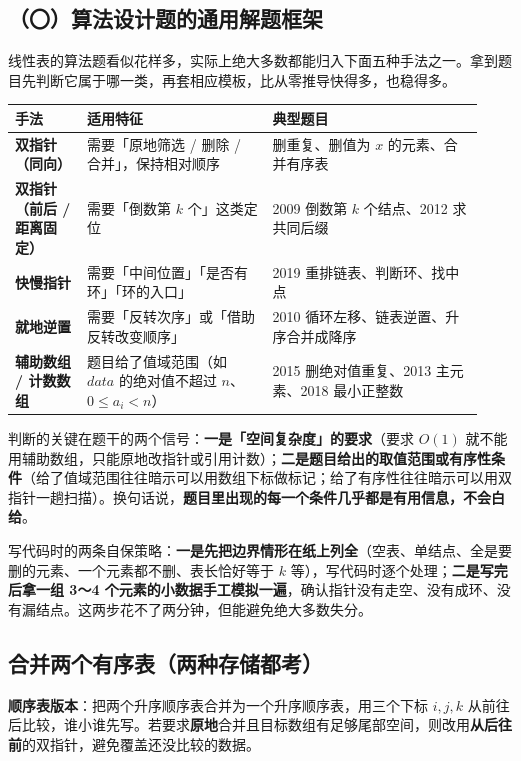 \documentclass[11pt,openany,UTF8]{ctexbook}
\begin{document}
\subsection{（〇）算法设计题的通用解题框架}

线性表的算法题看似花样多，实际上绝大多数都能归入下面五种手法之一。拿到题目先判断它属于哪一类，再套相应模板，比从零推导快得多，也稳得多。

\begingroup\small\setlength{\tabcolsep}{4.0pt}
\begin{longtable}{@{}L{0.1488\linewidth}L{0.3686\linewidth}L{0.4111\linewidth}@{}}
\toprule
\textbf{手法} & \textbf{适用特征} & \textbf{典型题目} \\
\midrule
\endhead
\textbf{双指针（同向）} & 需要「原地筛选 / 删除 / 合并」，保持相对顺序 & 删重复、删值为 $x$ 的元素、合并有序表 \\
\textbf{双指针（前后 / 距离固定）} & 需要「倒数第 $k$ 个」这类定位 & 2009 倒数第 $k$ 个结点、2012 求共同后缀 \\
\textbf{快慢指针} & 需要「中间位置」「是否有环」「环的入口」 & 2019 重排链表、判断环、找中点 \\
\textbf{就地逆置} & 需要「反转次序」或「借助反转改变顺序」 & 2010 循环左移、链表逆置、升序合并成降序 \\
\textbf{辅助数组 / 计数数组} & 题目给了值域范围（如 $data$ 的绝对值不超过 $n$、$0 \le a_i < n$） & 2015 删绝对值重复、2013 主元素、2018 最小正整数 \\
\bottomrule
\end{longtable}
\endgroup

判断的关键在题干的两个信号：\textbf{一是「空间复杂度」的要求}（要求 $O(1)$ 就不能用辅助数组，只能原地改指针或引用计数）；\textbf{二是题目给出的取值范围或有序性条件}（给了值域范围往往暗示可以用数组下标做标记；给了有序性往往暗示可以用双指针一趟扫描）。换句话说，\textbf{题目里出现的每一个条件几乎都是有用信息，不会白给}。

写代码时的两条自保策略：\textbf{一是先把边界情形在纸上列全}（空表、单结点、全是要删的元素、一个元素都不删、表长恰好等于 $k$ 等），写代码时逐个处理；\textbf{二是写完后拿一组 3～4 个元素的小数据手工模拟一遍}，确认指针没有走空、没有成环、没有漏结点。这两步花不了两分钟，但能避免绝大多数失分。

\subsection{合并两个有序表（两种存储都考）}

\textbf{顺序表版本}：把两个升序顺序表合并为一个升序顺序表，用三个下标 $i, j, k$ 从前往后比较，谁小谁先写。若要求\textbf{原地}合并且目标数组有足够尾部空间，则改用\textbf{从后往前}的双指针，避免覆盖还没比较的数据。
\end{document}
